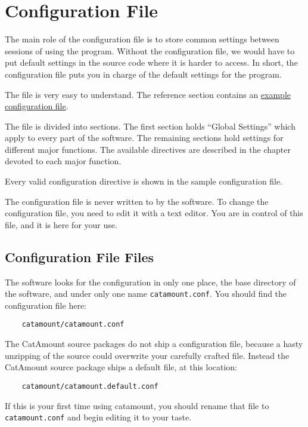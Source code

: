 \chapter{Configuration File}
\hypertarget{configuration-file}{}

The main role of the configuration file is to store common settings
between sessions of using the program. Without the configuration file,
we would have to put default settings in the source code where it is
harder to access. In short, the configuration file puts you in charge
of the default settings for the program.

The file is very easy to understand. The reference section contains an
\hyperlink{example-config}{example configuration file}.

The file is divided into sections. The first section holds ``Global
Settings'' which apply to every part of the software. The remaining
sections hold settings for different major functions. The available
directives are described in the chapter devoted to each major
function.

Every valid configuration directive is shown in the sample
configuration file.

The configuration file is never written to by the software. To change
the configuration file, you need to edit it with a text editor. You
are in control of this file, and it is here for your use.

\section{Configuration File Files}

The software looks for the configuration in only one place, the base
directory of the software, and under only one name
\verb=catamount.conf=. You should find the configuration file here:

\begin{verbatim}
    catamount/catamount.conf
\end{verbatim}

The CatAmount source packages do not ship a configuration file,
because a hasty unzipping of the source could overwrite your carefully
crafted file. Instead the CatAmount source package ships a default
file, at this location:

\begin{verbatim}
    catamount/catamount.default.conf
\end{verbatim}

If this is your first time using catamount, you should rename that
file to \verb=catamount.conf= and begin editing it to your taste.
